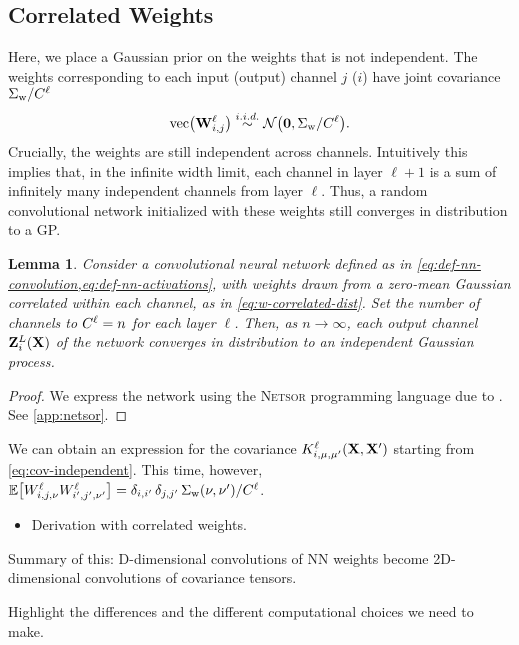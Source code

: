 \documentclass{article}
\newtheorem{lemma}{Lemma}
\newcommand{\vX}{\mathbf{X}}
\newcommand{\vW}{\mathbf{W}}
\newcommand{\vZ}{\mathbf{Z}}
\newcommand{\vecfun}{\text{vec}\bra}
\newcommand{\simiid}{\overset{i.i.d.}{\sim}}
\begin{document}
\subsection{Correlated Weights}
Here, we place a Gaussian prior on the weights that is not independent. The weights
corresponding to each input (output) channel $j$ ($i$) have joint covariance
$\Sigma_\text{w}/C^{\ell}$
\begin{equation}
  \vecfun{\vW\ssup{\ell}_{i,j}} \simiid \NormDist{\boldsymbol{0}, \Sigma_\text{w}/C\ssup{\ell}}.
  \label{eq:w-correlated-dist}
\end{equation}
Crucially, the weights are still independent across channels. Intuitively this
implies that, in the infinite width limit, each channel in layer $\ell+1$ is a
sum of infinitely many independent channels from layer $\ell$. Thus, a random
convolutional network initialized with these weights still converges in distribution
to a GP.

\begin{lemma}
  Consider a convolutional neural network defined as in
  \cref{eq:def-nn-convolution,eq:def-nn-activations}, with weights drawn from a
  zero-mean Gaussian correlated within each channel, as in \cref{eq:w-correlated-dist}.
  Set the number of channels to $C^{\ell} = n$ for each layer $\ell$. Then,
  as $n\to \infty$, each output channel $\vZ\ssup{L}_i(\vX)$ of the network converges in
  distribution to an independent Gaussian process.
\end{lemma}
\begin{proof}
  We express the network using the \textsc{Netsor} programming language due to
  \citet{yang2019wide}. See \cref{app:netsor}.
\end{proof}

We can obtain an expression for the covariance $K\ssup{\ell}_{i,\mu,\mu'}(\vX,
\vX')$ starting from \cref{eq:cov-independent}. This time, however,
$\ExpSymb\sqb{W\ssup{\ell}_{i,j,\nu}W\ssup{\ell}_{i',j',\nu'}} = \delta_{i,i'} \, \delta_{j, j'} \, \Sigma_{\text{w}}\bra{\nu,\nu'}/C\ssup{\ell}$.

  
\begin{itemize}
    \item Derivation with correlated weights.
\end{itemize}
Summary of this: D-dimensional convolutions of NN weights become 2D-dimensional convolutions of covariance tensors. 

Highlight the differences and the different computational choices we need to make.
\end{document}
